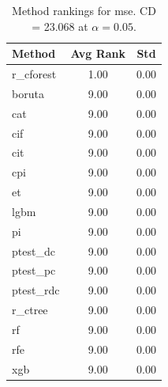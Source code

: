 \begin{table}[h]
\centering
\caption{Method rankings for mse. CD = 23.068 at $\alpha=0.05$.}
\label{tab:ranks_mse}
\begin{tabular}{lcc}
\toprule
Method & Avg Rank & Std \\
\midrule
r_cforest & 1.00 & 0.00 \\
boruta & 9.00 & 0.00 \\
cat & 9.00 & 0.00 \\
cif & 9.00 & 0.00 \\
cit & 9.00 & 0.00 \\
cpi & 9.00 & 0.00 \\
et & 9.00 & 0.00 \\
lgbm & 9.00 & 0.00 \\
pi & 9.00 & 0.00 \\
ptest_dc & 9.00 & 0.00 \\
ptest_pc & 9.00 & 0.00 \\
ptest_rdc & 9.00 & 0.00 \\
r_ctree & 9.00 & 0.00 \\
rf & 9.00 & 0.00 \\
rfe & 9.00 & 0.00 \\
xgb & 9.00 & 0.00 \\
\bottomrule
\end{tabular}
\end{table}